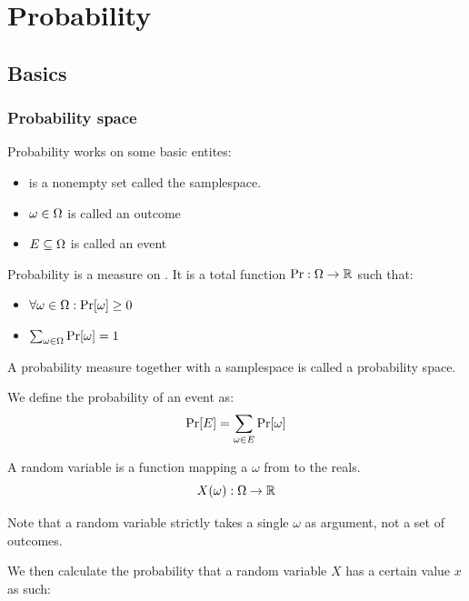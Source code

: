 \section{Probability}

\subsection{Basics}

\subsubsection{Probability space}

Probability works on some basic entites:
\begin{itemize}
    \item \samplespace is a nonempty set called the samplespace. 
    \item $\omega \in \Omega$ is called an outcome
    \item $E \subseteq \Omega$ is called an event
\end{itemize}


\begin{definition}[Probability]
    Probability is a measure on \samplespace. It is a total function $ \operatorname{Pr}: \Omega \to \mathbb{R} $ such that:
    \begin{itemize}
        \item $ \forall \omega \in \Omega : \operatorname{Pr}[\omega] \geq 0 $
        \item $ \sum_{\omega \in \Omega} \operatorname{Pr}[\omega] = 1 $
    \end{itemize}
\end{definition}

A probability measure together with a samplespace is called a probability space. 


We define the probability of an event as: 
$$ \operatorname{Pr}[E] = \sum_{\omega \in E} \operatorname{Pr}[\omega] $$

\begin{definition}
    A random variable is a function mapping a $\omega$ from \samplespace  to the reals. 
    $$ X(\omega) : \Omega \to \mathbb{R} $$
\end{definition}
Note that a random variable strictly takes a single $\omega$ as argument, not a set of outcomes. 

We then calculate the probability that a random variable $X$ has a certain value $x$ as such: 

